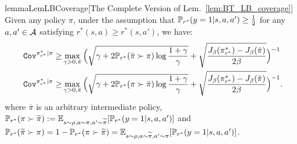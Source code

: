 \begin{restatable}{lemma}{LemLBCoverage}[The Complete Version of Lem.~\ref{lem:BT_LB_coverage}]\label{lem:LB_coverage_formal}
    Given any policy $\pi$, under the assumption that ${\mathbb{P}}_{r^*}(y=1|s,a,a') \geq \frac{1}{2}$ for any $a,a'\in\mathcal{A}$ satisfying $r^*(s,a) \geq r^*(s,a')$, we have:
    \begin{align}
        {\texttt{Cov}}^{\pi^*_{r^*}|\pi}\geq & \max_{\gamma > 0, \bar{\pi}} \Big(\sqrt{\gamma + 2{\mathbb{P}}_{r^*}(\bar{\pi}\succ\pi)\log\frac{1+\gamma}{\gamma}} +\sqrt{\frac{J_\beta(\pi^*_{r^*}) - J_\beta(\bar{\pi})}{2\beta}}\Big)^{-1} \label{eq:LB_2}\\
        {\texttt{Cov}}^{\pi^*_{r^*}|\pi} \geq & \max_{\gamma > 0, \bar{\pi}} \Big(\sqrt{\gamma + 2{\mathbb{P}}_{r^*}(\pi\succ\bar{\pi})\log\frac{1+\gamma}{\gamma}}+\sqrt{\frac{J_\beta(\pi^*_{r^*}) - J_\beta(\bar{\pi})}{2\beta}}\Big)^{-1}. \label{eq:LB_1}
    \end{align}
    where $\bar{\pi}$ is an arbitrary intermediate policy, ${\mathbb{P}}_{r^*}(\pi\succ \widetilde{\pi}) := \mathbb{E}_{s\sim\rho,a\sim\pi,a'\sim\widetilde{\pi}}[{\mathbb{P}}_{r^*}(y=1|s,a,a')]$ and ${\mathbb{P}}_{r^*}(\widetilde{\pi}\succ \pi) = 1 - {\mathbb{P}}_{r^*}(\pi\succ \widetilde{\pi}) = \mathbb{E}_{s\sim\rho,a\sim\widetilde{\pi},a'\sim\pi}[{\mathbb{P}}_{r^*}(y=1|s,a,a')]$.
\end{restatable}

